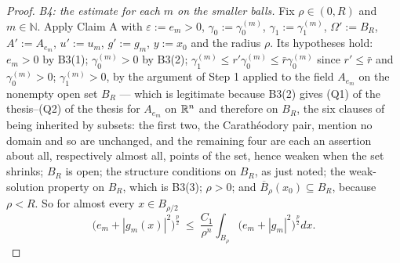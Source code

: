 \begin{proof}
\emph{B4: the estimate for each $m$ on the smaller balls.}  Fix
$\rho\in(0,R)$ and $m\in\mathbb{N}$.  Apply Claim A with $\varepsilon:=e_m>0$,
$\gamma_0:=\gamma_0^{(m)}$, $\gamma_1:=\gamma_1^{(m)}$, $\Omega':=B_R$,
$A':=A_{e_m}$, $u':=u_m$, $g':=g_m$, $y:=x_0$ and the radius $\rho$.  Its
hypotheses hold: $e_m>0$ by B3(1); $\gamma_0^{(m)}>0$ by B3(2);
$\gamma_1^{(m)}\le r'\gamma_0^{(m)}\le\bar r\gamma_0^{(m)}$ since
$r'\le\bar r$ and $\gamma_0^{(m)}>0$; $\gamma_1^{(m)}>0$, by the argument of
Step 1 applied to the field $A_{e_m}$ on the nonempty open set $B_R$ --- which is
legitimate because B3(2) gives (Q1) of the thesis--(Q2) of the thesis for $A_{e_m}$ on
$\mathbb{R}^n$ and therefore on $B_R$, the six clauses of
 being inherited by subsets: the first two, the
Carath\'eodory pair, mention no domain and so are unchanged, and the remaining
four are each an assertion about all, respectively almost all, points of the
set, hence weaken when the set shrinks; $B_R$ is open;
the structure conditions on $B_R$, as just noted; the weak-solution property on
$B_R$, which is B3(3); $\rho>0$; and
$\overline B_\rho(x_0)\subseteq B_R$, because $\rho<R$.  So for almost every
$x\in B_{\rho/2}$
\[
\bigl(e_m+|g_m(x)|^2\bigr)^{\frac p2}
\ \le\ \frac{C_1}{\rho^n}\int_{B_\rho}\bigl(e_m+|g_m|^2\bigr)^{\frac p2}dx .
\tag{B4}
\]


\end{proof}
